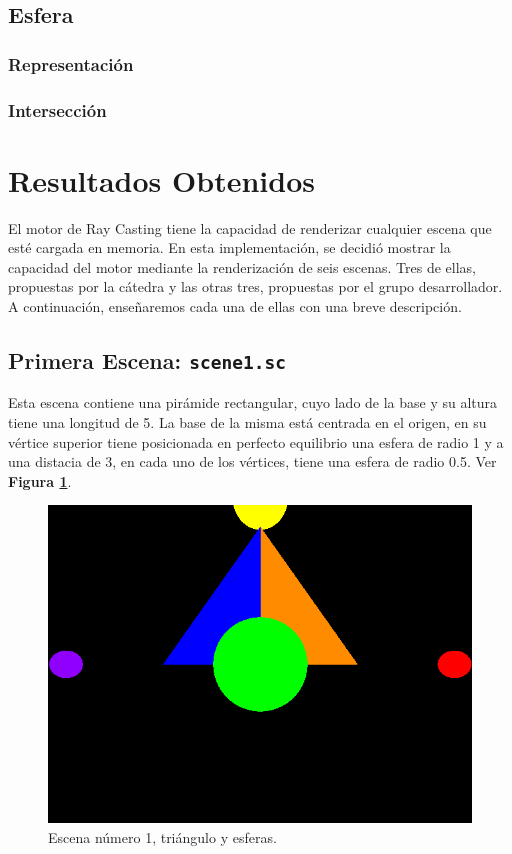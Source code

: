 \documentclass[a4paper,10pt]{article}
\begin{document}
\subsection{Esfera}

\subsubsection{Representaci\'on}

\subsubsection{Intersecci\'on}

\section{Resultados Obtenidos}
\label{escenas}
El motor de Ray Casting tiene la capacidad de renderizar cualquier escena que est\'e cargada en memoria.  En esta implementaci\'on, se decidi\'o mostrar la capacidad del motor mediante la renderizaci\'on de seis escenas.  Tres de ellas, propuestas por la c\'atedra y las otras tres, propuestas por el grupo desarrollador.  A continuaci\'on, ense\~naremos cada una de ellas con una breve descripci\'on.

\subsection{Primera Escena: \texttt{scene1.sc}}
Esta escena contiene una pir\'amide rectangular, cuyo lado de la base y su altura tiene una longitud de 5.  La base de la misma est\'a centrada en el origen, en su v\'ertice superior tiene posicionada en perfecto equilibrio una esfera de radio 1 y a una distacia de 3, en cada uno de los v\'ertices, tiene una esfera de radio 0.5. Ver \textbf{Figura \ref{fig:1}}.

\begin{figure}[h]
 \centering
 \includegraphics[width=320pt,keepaspectratio=true]{../scene1.png}
 \caption{Escena n\'umero 1, tri\'angulo y esferas.}
 \label{fig:1}
\end{figure}
\end{document}
